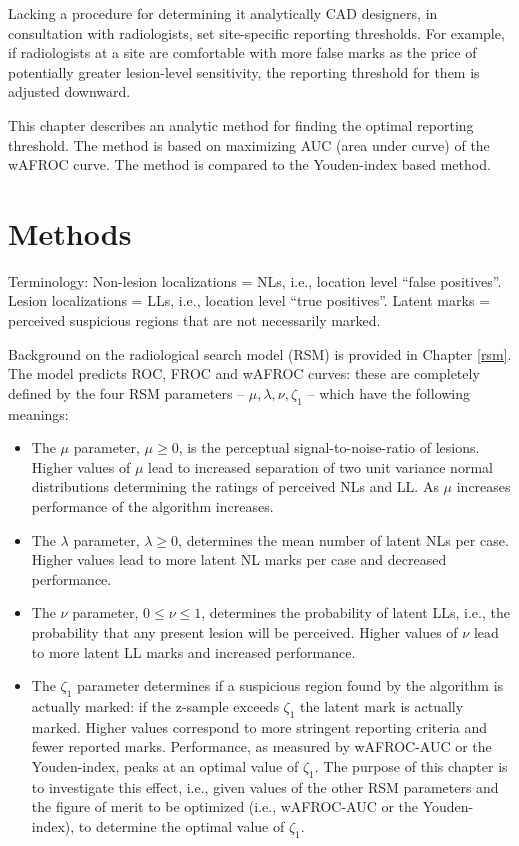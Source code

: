 \documentclass[
]{book}
\begin{document}
Lacking a procedure for determining it analytically CAD designers, in consultation with radiologists, set site-specific reporting thresholds. For example, if radiologists at a site are comfortable with more false marks as the price of potentially greater lesion-level sensitivity, the reporting threshold for them is adjusted downward.

This chapter describes an analytic method for finding the optimal reporting threshold. The method is based on maximizing AUC (area under curve) of the wAFROC curve. The method is compared to the Youden-index based method.

\hypertarget{optim-op-point-methods}{%
\section{Methods}\label{optim-op-point-methods}}

Terminology:
Non-lesion localizations = NLs, i.e., location level ``false positives''.
Lesion localizations = LLs, i.e., location level ``true positives''.
Latent marks = perceived suspicious regions that are not necessarily marked.

Background on the radiological search model (RSM) is provided in Chapter \ref{rsm}. The model predicts ROC, FROC and wAFROC curves: these are completely defined by the four RSM parameters -- \(\mu, \lambda, \nu, \zeta_1\) -- which have the following meanings:

\begin{itemize}
\item
  The \(\mu\) parameter, \(\mu \ge 0\), is the perceptual signal-to-noise-ratio of lesions. Higher values of \(\mu\) lead to increased separation of two unit variance normal distributions determining the ratings of perceived NLs and LL. As \(\mu\) increases performance of the algorithm increases.
\item
  The \(\lambda\) parameter, \(\lambda \ge 0\), determines the mean number of latent NLs per case. Higher values lead to more latent NL marks per case and decreased performance.
\item
  The \(\nu\) parameter, \(0 \le \nu \le 1\), determines the probability of latent LLs, i.e., the probability that any present lesion will be perceived. Higher values of \(\nu\) lead to more latent LL marks and increased performance.
\item
  The \(\zeta_1\) parameter determines if a suspicious region found by the algorithm is actually marked: if the z-sample exceeds \(\zeta_1\) the latent mark is actually marked. Higher values correspond to more stringent reporting criteria and fewer reported marks. Performance, as measured by wAFROC-AUC or the Youden-index, peaks at an optimal value of \(\zeta_1\). The purpose of this chapter is to investigate this effect, i.e., given values of the other RSM parameters and the figure of merit to be optimized (i.e., wAFROC-AUC or the Youden-index), to determine the optimal value of \(\zeta_1\).
\end{itemize}
\end{document}
